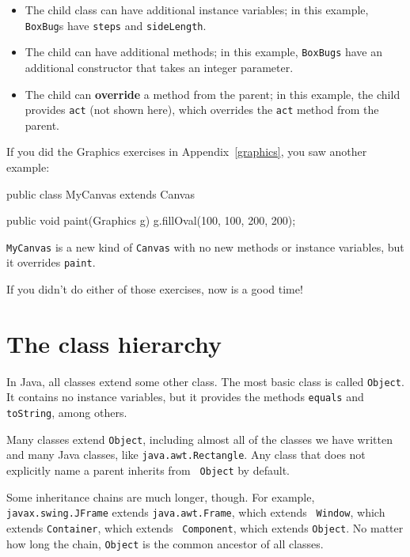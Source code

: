 \begin{itemize}

\item The child class can have additional instance variables; in
this example, {\tt BoxBug}s have {\tt steps} and {\tt sideLength}.

\item The child can have additional methods; in this example,
{\tt BoxBugs} have an additional constructor that takes an integer
parameter.

\item The child can {\bf override} a method from the parent; in
this example, the child provides {\tt act} (not shown here),
which overrides the {\tt act} method from the parent.

\end{itemize}

If you did the Graphics exercises in Appendix~\ref{graphics}, you
saw another example:

\begin{code}
public class MyCanvas extends Canvas {

    public void paint(Graphics g) {
        g.fillOval(100, 100, 200, 200);
    }
}
\end{code}

{\tt MyCanvas} is a new kind of {\tt Canvas} with no new methods
or instance variables, but it overrides {\tt paint}.

If you didn't do either of those exercises, now is a good time!


\section{The class hierarchy}

In Java, all classes extend some other class.  The most basic class is
called {\tt Object}.  It contains no instance variables, but it
provides the methods {\tt equals} and {\tt toString}, among others.

Many classes extend {\tt Object}, including almost all of the classes
we have written and many Java classes, like {\tt java.awt.Rectangle}.
Any class that does not explicitly name a parent inherits from {\tt
  Object} by default.

Some inheritance chains are much longer, though.  For example, {\tt
  javax.swing.JFrame} extends {\tt java.awt.Frame}, which extends {\tt
  Window}, which extends {\tt Container}, which extends {\tt
  Component}, which extends {\tt Object}.  No matter how long the
chain, {\tt Object} is the common ancestor of all classes.

